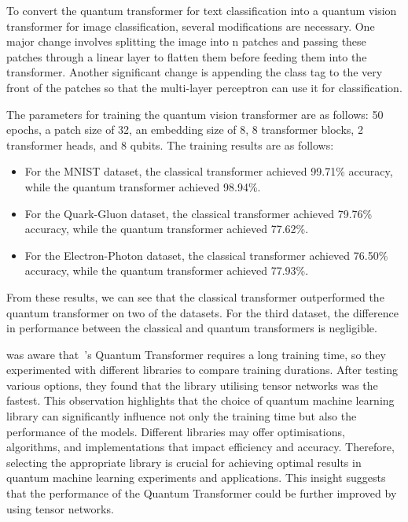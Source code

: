 To convert the quantum transformer for text classification into a
quantum vision transformer for image classification, several
modifications are necessary. One major change involves splitting the
image into n patches and passing these patches through a linear layer
to flatten them before feeding them into the transformer. Another
significant change is appending the class tag to the very front of
the patches so that the multi-layer perceptron can use it for classification.

The parameters for training the quantum vision transformer are as
follows: 50 epochs, a patch size of 32, an embedding size of 8, 8
transformer blocks, 2 transformer heads, and 8 qubits. The training
results are as follows:

\begin{itemize}
\item For the MNIST dataset, the classical transformer achieved
  99.71\% accuracy, while the quantum transformer achieved 98.94\%.

\item For the Quark-Gluon dataset, the classical transformer achieved
  79.76\% accuracy, while the quantum transformer achieved 77.62\%.

\item For the Electron-Photon dataset, the classical transformer
  achieved 76.50\% accuracy, while the quantum transformer achieved 77.93\%.
\end{itemize}

From these results, we can see that the classical transformer
outperformed the quantum transformer on two of the datasets. For the
third dataset, the difference in performance between the classical
and quantum transformers is negligible.

\citet{Cara2024QVT} was aware that~\citet{disipio2021dawn}’s Quantum
Transformer requires a long training time, so they experimented with
different libraries to compare training durations. After testing
various options, they found that the library utilising tensor
networks was the fastest. This observation highlights that the choice
of quantum machine learning library can significantly influence not
only the training time but also the performance of the models.
Different libraries may offer optimisations, algorithms, and
implementations that impact efficiency and accuracy. Therefore,
selecting the appropriate library is crucial for achieving optimal
results in quantum machine learning experiments and applications.
This insight suggests that the performance of the Quantum Transformer
could be further improved by using tensor networks.

